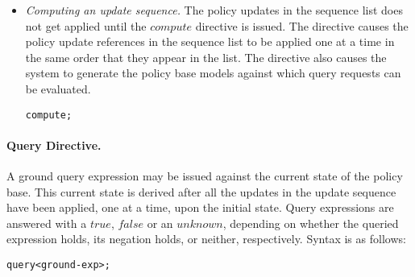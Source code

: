 \documentclass[global,twocolumn,final]{svjour}
\newenvironment{vverbatim}
  {\begin{alltt}}
  {\vspace{-\baselineskip}\end{alltt}}
\begin{document}
\begin{itemize}
          \item
            {\em Computing an update sequence.}
            The policy updates in the sequence list does not get applied until
            the $compute$ directive is issued. The directive causes the policy
            update references in the sequence list to be applied one at a time
            in the same order that they appear in the list. The directive also
            causes the system to generate the policy base models against which
            query requests can be evaluated.

            \begin{vverbatim}
  compute;
            \end{vverbatim}
        \end{itemize}

        \paragraph{Query Directive.}

          A ground query expression may be issued against the current state of
          the policy base. This current state is derived after all the updates
          in the update sequence have been applied, one at a time, upon the
          initial state. Query expressions are answered with a $true$, $false$
          or an $unknown$, depending on whether the queried expression holds,
          its negation holds, or neither, respectively. Syntax is as follows:

          \begin{vverbatim}
  query <ground-exp>;
          \end{vverbatim}
\end{document}
